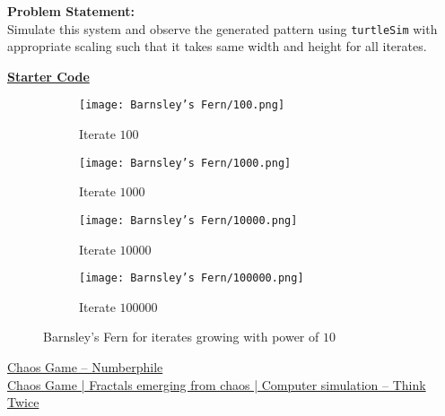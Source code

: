 \documentclass[../../Problems]{subfiles}
\begin{document}
\textbf{Problem Statement:}\\
Simulate this system and observe the generated pattern using \verb!turtleSim! with appropriate scaling such that it takes same width and height for all iterates.
\begin{tcolorbox}%
	\href{https://github.com/paramrathour/CS-101/tree/main/Starter Codes/Barnsley's Fern.cpp}{\textbf{Starter Code}}
\end{tcolorbox}
\begin{figure}[H]
	\centering
	\begin{subfigure}{0.22\linewidth}
		\texttt{[image: Barnsley's Fern/100.png]}
		\caption{Iterate $100$}
	\end{subfigure}
	\begin{subfigure}{0.22\linewidth}
		\texttt{[image: Barnsley's Fern/1000.png]}
		\caption{Iterate $1000$}
	\end{subfigure}
	\begin{subfigure}{0.22\linewidth}
		\texttt{[image: Barnsley's Fern/10000.png]}
		\caption{Iterate $10000$}
	\end{subfigure}
	\begin{subfigure}{0.22\linewidth}
		\texttt{[image: Barnsley's Fern/100000.png]}
		\caption{Iterate $100000$}
	\end{subfigure}
	\caption{Barnsley's Fern for iterates growing with power of $10$}
\end{figure}
\begin{funvideo}
	\href{https://youtu.be/kbKtFN71Lfs}{Chaos Game -- Numberphile}\\
	\href{https://youtu.be/IGlGvSXkRGI}{Chaos Game | Fractals emerging from chaos | Computer simulation -- Think Twice}
\end{funvideo}
\recalctypearea
\end{document}
